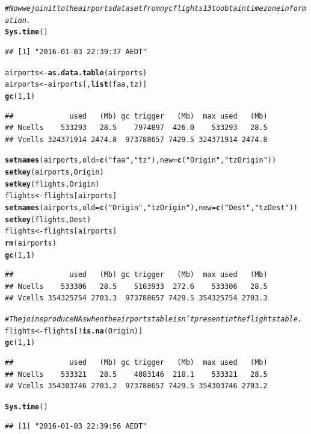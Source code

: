 \documentclass{scrreprt}\usepackage[]{graphicx}\usepackage[]{color}
\makeatletter
\newcommand{\hlnum}[1]{\textcolor[rgb]{0.686,0.059,0.569}{#1}}%
\newcommand{\hlstr}[1]{\textcolor[rgb]{0.192,0.494,0.8}{#1}}%
\newcommand{\hlcom}[1]{\textcolor[rgb]{0.678,0.584,0.686}{\textit{#1}}}%
\newcommand{\hlopt}[1]{\textcolor[rgb]{0,0,0}{#1}}%
\newcommand{\hlstd}[1]{\textcolor[rgb]{0.345,0.345,0.345}{#1}}%
\newcommand{\hlkwb}[1]{\textcolor[rgb]{0.69,0.353,0.396}{#1}}%
\newcommand{\hlkwc}[1]{\textcolor[rgb]{0.333,0.667,0.333}{#1}}%
\newcommand{\hlkwd}[1]{\textcolor[rgb]{0.737,0.353,0.396}{\textbf{#1}}}%
\newenvironment{kframe}{%
 \def\at@end@of@kframe{}%
 \ifinner\ifhmode%
  \def\at@end@of@kframe{\end{minipage}}%
  \begin{minipage}{\columnwidth}%
 \fi\fi%
 \def\FrameCommand##1{\hskip\@totalleftmargin \hskip-\fboxsep
 \colorbox{shadecolor}{##1}\hskip-\fboxsep
     \hskip-\linewidth \hskip-\@totalleftmargin \hskip\columnwidth}%
 \MakeFramed {\advance\hsize-\width
   \@totalleftmargin\z@ \linewidth\hsize
   \@setminipage}}%
 {\par\unskip\endMakeFramed%
 \at@end@of@kframe}
\newenvironment{knitrout}{}{} %
\makeatother
\begin{document}
\begin{knitrout}
\color{fgcolor}\begin{kframe}
\begin{alltt}
\hlcom{# Now we join it to the airports dataset from nycflights13 to obtain time zone information.}
\hlkwd{Sys.time}\hlstd{()}
\end{alltt}
\begin{verbatim}
## [1] "2016-01-03 22:39:37 AEDT"
\end{verbatim}
\begin{alltt}
\hlstd{airports} \hlkwb{<-} \hlkwd{as.data.table}\hlstd{(airports)}
\hlstd{airports} \hlkwb{<-} \hlstd{airports[,}\hlkwd{list}\hlstd{(faa, tz)]}
\hlkwd{gc}\hlstd{(}\hlnum{1}\hlstd{,}\hlnum{1}\hlstd{)}
\end{alltt}
\begin{verbatim}
##             used   (Mb) gc trigger   (Mb)  max used   (Mb)
## Ncells    533293   28.5    7974897  426.0    533293   28.5
## Vcells 324371914 2474.8  973788657 7429.5 324371914 2474.8
\end{verbatim}
\begin{alltt}
\hlkwd{setnames}\hlstd{(airports,} \hlkwc{old} \hlstd{=} \hlkwd{c}\hlstd{(}\hlstr{"faa"}\hlstd{,} \hlstr{"tz"}\hlstd{),} \hlkwc{new} \hlstd{=} \hlkwd{c}\hlstd{(}\hlstr{"Origin"}\hlstd{,} \hlstr{"tzOrigin"}\hlstd{))}
\hlkwd{setkey}\hlstd{(airports, Origin)}
\hlkwd{setkey}\hlstd{(flights, Origin)}
\hlstd{flights} \hlkwb{<-} \hlstd{flights[airports]}
\hlkwd{setnames}\hlstd{(airports,} \hlkwc{old} \hlstd{=} \hlkwd{c}\hlstd{(}\hlstr{"Origin"}\hlstd{,} \hlstr{"tzOrigin"}\hlstd{),} \hlkwc{new} \hlstd{=} \hlkwd{c}\hlstd{(}\hlstr{"Dest"}\hlstd{,} \hlstr{"tzDest"}\hlstd{))}
\hlkwd{setkey}\hlstd{(flights, Dest)}
\hlstd{flights} \hlkwb{<-} \hlstd{flights[airports]}
\hlkwd{rm}\hlstd{(airports)}
\hlkwd{gc}\hlstd{(}\hlnum{1}\hlstd{,}\hlnum{1}\hlstd{)}
\end{alltt}
\begin{verbatim}
##             used   (Mb) gc trigger   (Mb)  max used   (Mb)
## Ncells    533306   28.5    5103933  272.6    533306   28.5
## Vcells 354325754 2703.3  973788657 7429.5 354325754 2703.3
\end{verbatim}
\begin{alltt}
\hlcom{# The joins produce NAs when the airports table isn't present in the flights table.}
\hlstd{flights} \hlkwb{<-} \hlstd{flights[}\hlopt{!}\hlkwd{is.na}\hlstd{(Origin)]}
\hlkwd{gc}\hlstd{(}\hlnum{1}\hlstd{,}\hlnum{1}\hlstd{)}
\end{alltt}
\begin{verbatim}
##             used   (Mb) gc trigger   (Mb)  max used   (Mb)
## Ncells    533321   28.5    4083146  218.1    533321   28.5
## Vcells 354303746 2703.2  973788657 7429.5 354303746 2703.2
\end{verbatim}
\begin{alltt}
\hlkwd{Sys.time}\hlstd{()}
\end{alltt}
\begin{verbatim}
## [1] "2016-01-03 22:39:56 AEDT"
\end{verbatim}
\end{kframe}
\end{knitrout}
\end{document}
